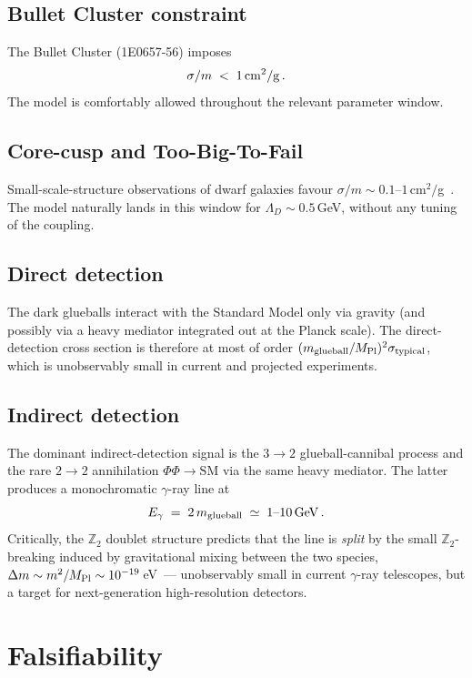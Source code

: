 \documentclass[aps,prd,twocolumn,nofootinbib,superscriptaddress,floatfix]{revtex4-2}
\begin{document}
\subsection{Bullet Cluster constraint}
The Bullet Cluster (1E0657-56) imposes~\cite{Markevitch2004}
\begin{equation}
    \sigma/m \;<\; 1\,{\rm cm}^2/{\rm g}\,.
\end{equation}
The model is comfortably allowed throughout the relevant parameter window.

\subsection{Core-cusp and Too-Big-To-Fail}
Small-scale-structure observations of dwarf galaxies favour $\sigma/m\sim 0.1$--$1\,$cm$^2/$g~\cite{deBlok2010,BBK2011,BullockBoylanKolchin2017,TulinYu2018}. The model naturally lands in this window for $\Lambda_D\sim 0.5\,$GeV, without any tuning of the coupling.

\subsection{Direct detection}
The dark glueballs interact with the Standard Model only via gravity (and possibly via a heavy mediator integrated out at the Planck scale). The direct-detection cross section is therefore at most of order $(m_{\rm glueball}/M_{\rm Pl})^2 \sigma_{\rm typical}$, which is unobservably small in current and projected experiments.

\subsection{Indirect detection}
The dominant indirect-detection signal is the $3\to 2$ glueball-cannibal process and the rare $2\to 2$ annihilation $\Phi\Phi\to \text{SM}$ via the same heavy mediator. The latter produces a monochromatic $\gamma$-ray line at
\begin{equation}
    E_\gamma \;=\; 2\,m_{\rm glueball} \;\simeq\; 1\text{--}10\,{\rm GeV}\,.
\end{equation}
Critically, the $\mathbb{Z}_2$ doublet structure predicts that the line is \emph{split} by the small $\mathbb{Z}_2$-breaking induced by gravitational mixing between the two species, $\Delta m \sim m^2/M_{\rm Pl}\sim 10^{-19}\,$eV~--- unobservably small in current $\gamma$-ray telescopes, but a target for next-generation high-resolution detectors.

\section{Falsifiability}
\label{sec:falsifiability}
\end{document}
